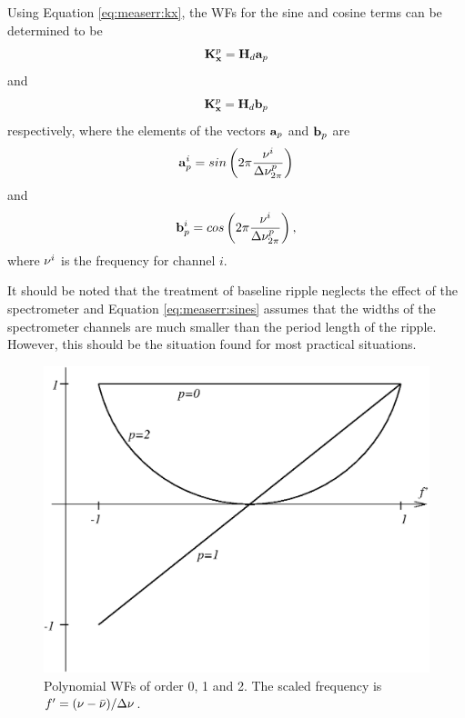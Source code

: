  Using Equation \ref{eq:measerr:kx}, the
 WFs for the sine and cosine terms can be determined to be
 \begin{equation}
   \mathbf{K}_{\mathbf{x}}^p = \mathbf{H}_d \mathbf{a}_p
 \end{equation}
 and
 \begin{equation}
   \mathbf{K}_{\mathbf{x}}^p = \mathbf{H}_d \mathbf{b}_p
 \end{equation}
 respectively, where the elements of the vectors $\mathbf{a}_p$ and
 $\mathbf{b}_p$ are
 \begin{equation}
   \mathbf{a}_p^i = sin\left(2\pi\frac{\nu^i}{\Delta \nu_{2\pi}^p}\right) 
 \end{equation}
 and
 \begin{equation}
   \mathbf{b}_p^i = cos\left(2\pi\frac{\nu^i}{\Delta \nu_{2\pi}^p}\right),
 \end{equation}
 where $\nu^i$ is the frequency for channel $i$.
 
 It should be noted that the treatment of baseline ripple neglects the
 effect of the spectrometer and Equation \ref{eq:measerr:sines} assumes
 that the widths of the spectrometer channels are much smaller than
 the period length of the ripple. However, this should be the
 situation found for most practical situations.



 \label{sec:measerr:pol}
 
 \begin{figure}
  \begin{center}
   \begin{minipage}[c]{0.65\textwidth}
    \centering
    \includegraphics*[width=0.99\hsize]{Figs/kpol.eps}
   \end{minipage}%
   \hspace{0.03\textwidth}%
   \begin{minipage}[c]{0.30\textwidth}
    \centering
    \caption{Polynomial WFs of order 0, 1 and 2. The scaled frequency is
             \mbox{$f'=(\nu-\bar{\nu})/\Delta \nu$.}}
    \label{fig:measerr:kpol}
   \end{minipage}
  \end{center}
 \end{figure}           

